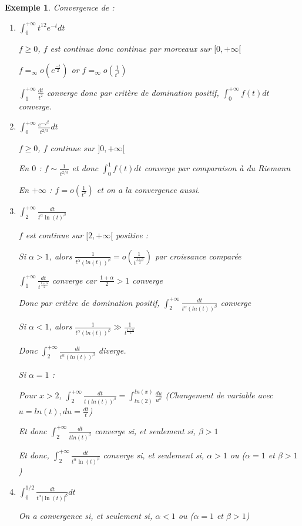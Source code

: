 \documentclass[a4paper,12pt]{book}
\newtheorem{Exe}{Exemple}[section]
\begin{document}
\begin{Exe}
Convergence de :\begin{enumerate} \item $\int_0^{+\infty} t^{12}e^{-t}dt$
\par $f\geq 0$, $f$ est continue donc continue par morceaux sur $[0,+\infty[$ \par $f=_\infty o(e^{\frac{-t}{2}})$ or $f=_\infty o(\frac{1}{t^2})$ \par $\int_1^{+\infty}\frac{dt}{t^2}$ converge donc par critère de domination positif, $\int_0^{+\infty}f(t)dt$ converge.
\item $\int_0^{+\infty}\frac{e^{-\sqrt{t}}}{t^{2/3}}dt$
\par $f\geq 0$, $f$ continue sur $]0,+\infty[$ \par En $0$ : $f\sim\frac{1}{t^{2/3}}$ et donc $\int_0^1f(t)dt$ converge par comparaison à du Riemann \par En $+\infty$ : $f=o\left(\frac{1}{t^2}\right)$ et on a la convergence aussi.
\item $\int_2^{+\infty}\frac{dt}{t^\alpha\ln(t)^\beta}$
\par $f$ est continue sur $[2,+\infty[$ positive : \par Si $\alpha>1$, alors $\frac{1}{t^\alpha(ln(t))^\beta}=o\left(\frac{1}{t^{\frac{1+\alpha}{2}}}\right)$ par croissance comparée \par $\int_1^{+\infty}\frac{dt}{t^{\frac{1+\alpha}{2}}}$ converge car $\frac{1+\alpha}{2}>1$ converge \par Donc par critère de domination positif, $\int_2^{+\infty}\frac{dt}{t^\alpha(ln(t))^\beta}$ converge \par Si $\alpha<1$, alors $\frac{1}{t^\alpha(ln(t))^\beta}\gg\frac{1}{t^{\frac{1+\alpha}{2}}}$ \par Donc $\int_2^{+\infty}\frac{dt}{t^\alpha(ln(t))^\beta}$ diverge.
\par Si $\alpha = 1$ : \par Pour $x>2$, $\int_2^{+\infty}\frac{dt}{t(ln(t))^\beta}=\int_{ln(2)}^{ln(x)}\frac{du}{u^\beta}$ (Changement de variable avec $u = ln(t), du = \frac{dt}{t}$) \par Et donc $\int_2^{+\infty}\frac{dt}{tln(t)^\beta}$ converge si, et seulement si, $\beta>1$ \par Et donc, $\int_2^{+\infty}\frac{dt}{t^\alpha\ln(t)^\beta}$ converge si, et seulement si, $\alpha>1$ ou ($\alpha = 1$ et $\beta>1$)
\item $\int_0^{1/2}\frac{dt}{t^\alpha\vert\ln(t)\vert^\beta}dt$ \par On a convergence si, et seulement si, $\alpha<1$ ou ($\alpha = 1$ et $\beta>1$)
\end{enumerate}
\end{Exe}
\end{document}
